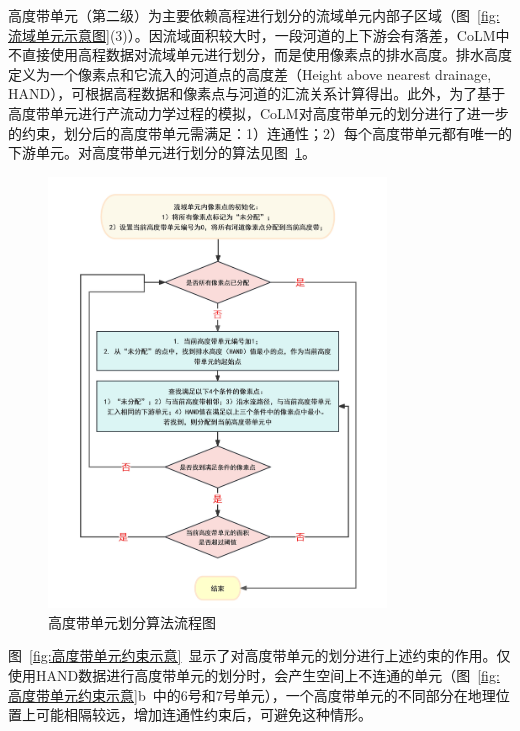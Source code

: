 高度带单元（第二级）为主要依赖高程进行划分的流域单元内部子区域（图~\ref{fig:流域单元示意图}(3)）。因流域面积较大时，一段河道的上下游会有落差，CoLM中不直接使用高程数据对流域单元进行划分，而是使用像素点的排水高度。排水高度定义为一个像素点和它流入的河道点的高度差（Height above nearest drainage, HAND），可根据高程数据和像素点与河道的汇流关系计算得出。此外，为了基于高度带单元进行产流动力学过程的模拟，CoLM对高度带单元的划分进行了进一步的约束，划分后的高度带单元需满足：1）连通性；2）每个高度带单元都有唯一的下游单元。对高度带单元进行划分的算法见图~\ref{fig:高度带单元算法流程}。

{
\begin{figure}[htbp]
\centering
\includegraphics[width=0.8\textwidth]{Figures/模式构架/高度带单元划分算法.jpg}
\caption{高度带单元划分算法流程图}
\label{fig:高度带单元算法流程}
\end{figure}
}

图~\ref{fig:高度带单元约束示意}~显示了对高度带单元的划分进行上述约束的作用。仅使用HAND数据进行高度带单元的划分时，会产生空间上不连通的单元（图~\ref{fig:高度带单元约束示意}b~中的6号和7号单元），一个高度带单元的不同部分在地理位置上可能相隔较远，增加连通性约束后，可避免这种情形。

